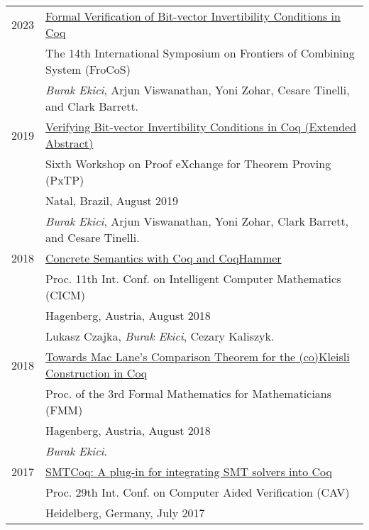 \documentclass[a4paper,9pt]{article} %
\begin{document}
\begin{longtable}{ll}	
2023 & 
{\href{https://link.springer.com/chapter/10.1007/978-3-031-43369-6_3}{Formal Verification of Bit-vector Invertibility Conditions in Coq}} \\
& The 14th International Symposium on Frontiers of Combining System (FroCoS) \\
& \emph{Burak Ekici}, Arjun Viswanathan, Yoni Zohar, Cesare
Tinelli, and Clark Barrett.
 \\[0.20cm]
2019 & 
{\href{http://pxtp.gforge.inria.fr/2019/papers/PxTP_2019_paper_5.pdf}{Verifying Bit-vector Invertibility Conditions in Coq (Extended Abstract)}}\\
& Sixth Workshop on Proof eXchange for Theorem Proving (PxTP)\\
& Natal, Brazil, August 2019 \\
& \emph{Burak Ekici}, Arjun Viswanathan, Yoni Zohar, Clark Barrett, and Cesare
Tinelli.
 \\[0.20cm]
2018 & 
{\href{https://www.mimuw.edu.pl/~lukaszcz/cicm2018.pdf}{Concrete Semantics with Coq and CoqHammer}}\\ 
& Proc. 11th Int. Conf. on Intelligent Computer Mathematics (CICM)\\
& Hagenberg, Austria, August 2018\\
& Lukasz Czajka, \emph{Burak Ekici}, Cezary Kaliszyk.
 \\[0.20cm]
2018 & 
{\href{https://www.cicm-conference.org/2018/infproc/paper11.pdf}{Towards Mac Lane's Comparison Theorem for the (co)Kleisli Construction in Coq}}\\
& Proc. of the 3rd Formal Mathematics for Mathematicians (FMM) \\
& Hagenberg, Austria, August 2018 \\
& \emph{Burak Ekici}.
 \\[0.20cm]
2017 & 
{\href{http://homepage.divms.uiowa.edu/~tinelli/papers/EkiEtAl-CAV-17.pdf}{SMTCoq: A plug-in for integrating SMT solvers into Coq}}\\
& Proc. 29th Int. Conf. on Computer Aided Verification (CAV) \\
& Heidelberg, Germany, July 2017 \\

\end{longtable}
\end{document}
